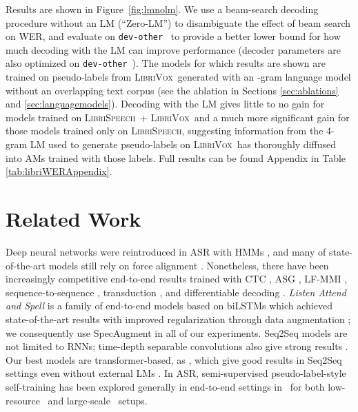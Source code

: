\documentclass{article}
\def\devother{\texttt{dev-other}}
\newcommand{\librivox}{\textsc{LibriVox}}
\newcommand{\librispeech}{\textsc{LibriSpeech}}
\begin{document}
Results are shown in Figure~\ref{fig:lmnolm}. We use a beam-search decoding procedure without an LM (``Zero-LM'') to disambiguate the effect of beam search on WER, and evaluate on \devother~ to provide a better lower bound for how much decoding with the LM can improve performance (decoder parameters are also optimized on \devother~). The models for which results are shown are trained on pseudo-labels from \librivox~generated with an -gram language model without an overlapping text corpus (see the ablation in Sections \ref{sec:ablations} and \ref{sec:languagemodels}). Decoding with the LM gives little to no gain for models trained on \librispeech~+ \librivox~and a much more significant gain for those models trained only on \librispeech, suggesting information from the 4-gram LM used to generate pseudo-labels on \librivox~has thoroughly diffused into AMs trained with those labels. Full results can be found Appendix in Table \ref{tab:libriWERAppendix}.


\section{Related Work} 
Deep neural networks were reintroduced in ASR with HMMs \cite{hinton2012dnnasr}, and many of state-of-the-art models still rely on force alignment \cite{han2017capio,luscher2019transformers,karita2019comparative}. Nonetheless, there have been increasingly competitive end-to-end results trained with CTC \cite{graves2014e2easr,amodei2016deep}, ASG \cite{collobert2016wav2letter, zeghidour2018fullyconv}, LF-MMI \cite{hadian2018end}, sequence-to-sequence \cite{chan2016las,chiu2018s2s}, transduction \cite{prabhavalkar2017comparison,he2019rnnt}, and differentiable decoding \cite{collobert2019diffdec}. \textit{Listen Attend and Spell} \cite{chan2016las} is a family of end-to-end models based on biLSTMs which achieved state-of-the-art results with improved regularization through data augmentation \cite{park2019specaug}; we consequently use SpecAugment in all of our experiments. Seq2Seq models are not limited to RNNs; time-depth separable convolutions also give strong results \cite{hannun2019TDS}. Our best models are transformer-based, as \cite{luscher2019transformers,karita2019comparative}, which give good results in Seq2Seq settings even without external LMs \cite{mohamed2019transformers}. In ASR, semi-supervised pseudo-label-style self-training has been explored generally in end-to-end settings in~\cite{soltau2016neural,li2019semi,kahn2019self} for both low-resource~\cite{vesely2017semi,cui2017knowledge} and large-scale~\cite{parthasarathi2019lessons} setups.
\end{document}
